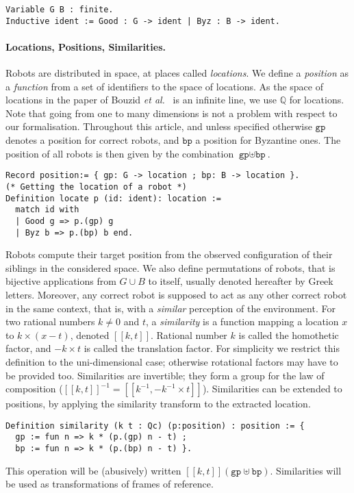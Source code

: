 \documentclass[11pt,a4]{llncs}
\newcommand{\x}{\xspace}
\newcommand{\setQ}{\ensuremath{\mathbb{Q}}\x}
\newcommand{\gp}{\ensuremath{\texttt{gp}\x}}
\newcommand{\bp}{\ensuremath{\texttt{bp}\x}}
\newcommand{\sem}[1]{\ensuremath{[\![#1]\!]\x}}
\begin{document}
\begin{lstlisting}
Variable G B : finite.
Inductive ident := Good : G -> ident | Byz : B -> ident.
\end{lstlisting}

\paragraph*{Locations, Positions, Similarities.}
Robots are distributed in space, at places called \emph{locations}.
We define a \emph{position} as a \emph{function} from a set of identifiers to
the space of locations. As the space of locations in the paper of
Bouzid \emph{et al.}~\cite{bouzid10tcs} is an infinite line, we use \setQ
for locations. Note that going from one to many dimensions is not a
problem with respect to our formalisation.  Throughout this article,
and unless specified otherwise $\gp$ denotes a position for
correct robots, and $\bp$ a position for Byzantine ones. The position of
all robots is then given by the combination $\gp \uplus \bp$.

\begin{lstlisting}
Record position:= { gp: G -> location ; bp: B -> location }.
(* Getting the location of a robot *)
Definition locate p (id: ident): location :=
  match id with 
  | Good g => p.(gp) g 
  | Byz b => p.(bp) b end.
\end{lstlisting}

Robots compute their target position from the observed configuration of their
siblings in the considered space. We also define permutations of robots, that is bijective applications from $G\cup B$ to itself, usually denoted hereafter by Greek
letters.
Moreover, any correct robot is supposed to act as any other correct
robot in the same context, that is, with a \emph{similar} perception
of the environment.
For two rational numbers $k \neq 0$ and $t$, a \emph{similarity} is a
function mapping a location $x$ to $k\times (x - t)$, denoted
$\sem{k,t}$. Rational number $k$ is called the homothetic factor, and
$-k\times t$ is called the translation factor. For
simplicity we restrict this definition to the uni-dimensional
case; otherwise rotational factors may have to be provided too.
Similarities are invertible; they form a group for the law of composition
($\sem{k,t}^{-1} = \sem{k^{-1},-k^{-1}\times t}$).
Similarities can be extended to positions, by applying the similarity
transform to the extracted location.
\begin{lstlisting}
Definition similarity (k t : Qc) (p:position) : position := {
  gp := fun n => k * (p.(gp) n - t) ; 
  bp := fun n => k * (p.(bp) n - t) }.
\end{lstlisting}
This operation will be (abusively) written $\sem{k,t} (\gp \uplus
\bp)$. Similarities will be used as transformations of frames of
reference.
\end{document}
